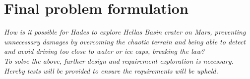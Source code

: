 \chapter{Final problem formulation}\label{ch:finalproblem}
\textit{How is it possible for Hades to explore Hellas Basin crater on Mars, preventing unnecessary damages by overcoming the chaotic terrain and being able to detect and avoid driving too close to water or ice caps, breaking the law?\\ To solve the above, further design and requirement exploration is necessary. Hereby tests will be provided to ensure the requirements will be upheld.}







